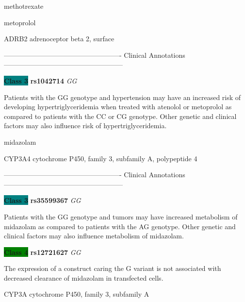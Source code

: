 \documentclass{resume} %
\begin{document}
\begin{rSection}{ methotrexate }
\end{rSection}\begin{rSection}{ metoprolol }
\item[]

\begin{rSubsection}{ ADRB2 }{ adrenoceptor beta 2, surface }{}{}
\item[]

\item[] ---------------------------------------------------- Clinical Annotations -----------------------------------------------------\newline
\item \textbf{\colorbox{teal} {Class 3}} \textbf{ rs1042714 } \textit{ GG }
\item[] Patients with the GG genotype and hypertension may have an increased risk of developing hypertriglyceridemia when treated with atenolol or metoprolol as compared to patients with the CC or CG genotype. Other genetic and clinical factors may also influence risk of hypertriglyceridemia. 
\end{rSubsection}

\end{rSection}\begin{rSection}{ midazolam }
\item[]

\begin{rSubsection}{ CYP3A4 }{ cytochrome P450, family 3, subfamily A, polypeptide 4 }{}{}
\item[]

\item[] ---------------------------------------------------- Clinical Annotations -----------------------------------------------------\newline
\item \textbf{\colorbox{teal} {Class 3}} \textbf{ rs35599367 } \textit{ GG }
\item[] Patients with the GG genotype and tumors may have increased metabolism of midazolam as compared to patients with the AG genotype. Other genetic and clinical factors may also influence metabolism of midazolam. \item \textbf{\colorbox{green} {Class 4}} \textbf{ rs12721627 } \textit{ GG }
\item[] The expression of a construct caring the G variant is not associated with decreased clearance of midazolam in transfected cells.
\end{rSubsection}\begin{rSubsection}{ CYP3A }{ cytochrome P450, family 3, subfamily A }{}{}
\item[]


\end{rSubsection}
\end{rSection}
\end{document}
